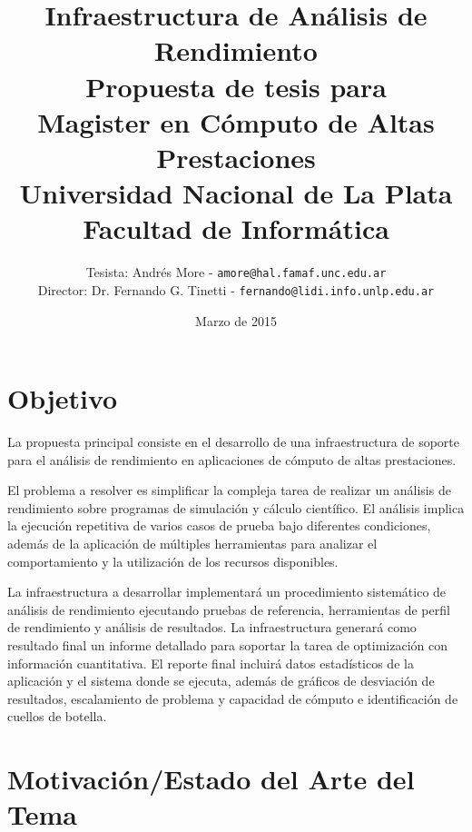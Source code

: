 \documentclass[a4paper]{article}
\begin{document}
\title{Infraestructura de Análisis de Rendimiento\\
\bigskip
{\large Propuesta de tesis para\\} Magister en Cómputo de Altas Prestaciones\\
\bigskip
Universidad Nacional de La Plata\\
Facultad de Informática\\
\bigskip
}

\author{Tesista: Andrés More - {\tt amore@hal.famaf.unc.edu.ar}\\
Director: Dr. Fernando G. Tinetti - {\tt fernando@lidi.info.unlp.edu.ar}}

\date{Marzo de 2015}

\maketitle

\newpage

\section{Objetivo}

La propuesta principal consiste en el desarrollo de una infraestructura de soporte para el análisis de rendimiento en aplicaciones de cómputo de altas prestaciones.

\bigskip

El problema a resolver es simplificar la compleja tarea de realizar un análisis de rendimiento sobre programas de simulación y cálculo científico. El análisis implica la ejecución repetitiva de varios casos de prueba bajo diferentes condiciones, además de la aplicación de múltiples herramientas para analizar el comportamiento y la utilización de los recursos disponibles.

\bigskip

La infraestructura a desarrollar implementará un procedimiento sistemático de análisis de rendimiento ejecutando pruebas de referencia, herramientas de perfil de rendimiento y análisis de resultados.  La infraestructura generará como resultado final un informe detallado para soportar la tarea de optimización con información cuantitativa. El reporte final incluirá datos estadísticos de la aplicación y el sistema donde se ejecuta, además de gráficos de desviación de resultados, escalamiento de problema y capacidad de cómputo e identificación de cuellos de botella.

\section{Motivación/Estado del Arte del Tema}
\end{document}
